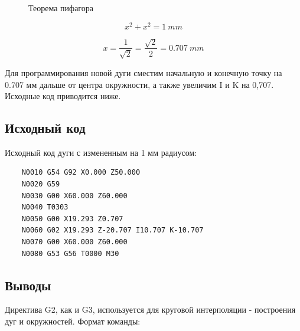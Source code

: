 \begin{figure}[ht]
\centering
{}
\caption{Теорема пифагора\label{fig:pifagor}}
\end{figure}


\begin{equation}
    x^2 + x^2 = 1~mm
\end{equation}

\begin{equation}
    x = \frac{1}{\sqrt{2}} = \frac{\sqrt{2}}{2} = 0.707~mm
\end{equation}

Для программирования новой дуги сместим начальную и конечную точку на 0.707 мм дальше от центра окружности, а также увеличим I и K на 0,707. Исходные код приводится ниже.

\subsection*{Исходный код}

Исходный код дуги с измененным на 1 мм радиусом:

\begin{verbatim}
	N0010 G54 G92 X0.000 Z50.000
	N0020 G59
	N0030 G00 X60.000 Z60.000
	N0040 T0303
	N0050 G00 X19.293 Z0.707
	N0060 G02 X19.293 Z-20.707 I10.707 K-10.707
	N0070 G00 X60.000 Z60.000
	N0080 G53 G56 T0000 M30
\end{verbatim}

\subsection*{Выводы}

Директива G2, как и G3, используется для круговой интерполяции - построения дуг и окружностей. Формат команды:

